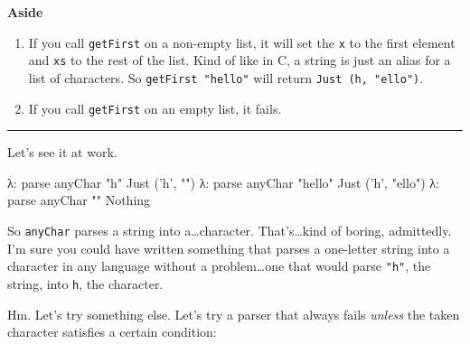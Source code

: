 \documentclass[]{article}
\newenvironment{Shaded}{}{}
\newcommand{\DataTypeTok}[1]{\textcolor[rgb]{0.56,0.13,0.00}{{#1}}}
\newcommand{\CharTok}[1]{\textcolor[rgb]{0.25,0.44,0.63}{{#1}}}
\newcommand{\StringTok}[1]{\textcolor[rgb]{0.25,0.44,0.63}{{#1}}}
\newcommand{\FunctionTok}[1]{\textcolor[rgb]{0.02,0.16,0.49}{{#1}}}
\newcommand{\NormalTok}[1]{{#1}}
\begin{document}
\textbf{Aside}

\begin{enumerate}
\def\labelenumi{\arabic{enumi}.}
\tightlist
\item
  If you call \texttt{getFirst} on a non-empty list, it will set the
  \texttt{x} to the first element and \texttt{xs} to the rest of the
  list. Kind of like in C, a string is just an alias for a list of
  characters. So \texttt{getFirst\ "hello"} will return
  \texttt{Just\ (\textquotesingle{}h\textquotesingle{},\ "ello")}.
\item
  If you call \texttt{getFirst} on an empty list, it fails.
\end{enumerate}

\begin{center}\rule{0.5\linewidth}{\linethickness}\end{center}

Let's see it at work.

\begin{Shaded}
\begin{Highlighting}[]
\NormalTok{λ}\FunctionTok{:} \NormalTok{parse anyChar }\StringTok{"h"}
\DataTypeTok{Just} \NormalTok{(}\CharTok{'h'}\NormalTok{, }\StringTok{""}\NormalTok{)}
\NormalTok{λ}\FunctionTok{:} \NormalTok{parse anyChar }\StringTok{"hello"}
\DataTypeTok{Just} \NormalTok{(}\CharTok{'h'}\NormalTok{, }\StringTok{"ello"}\NormalTok{)}
\NormalTok{λ}\FunctionTok{:} \NormalTok{parse anyChar }\StringTok{""}
\DataTypeTok{Nothing}
\end{Highlighting}
\end{Shaded}

So \texttt{anyChar} parses a string into a\ldots{}character.
That's\ldots{}kind of boring, admittedly. I'm sure you could have
written something that parses a one-letter string into a character in
any language without a problem\ldots{}one that would parse \texttt{"h"},
the string, into \texttt{\textquotesingle{}h\textquotesingle{}}, the
character.

Hm. Let's try something else. Let's try a parser that always fails
\emph{unless} the taken character satisfies a certain condition:
\end{document}
